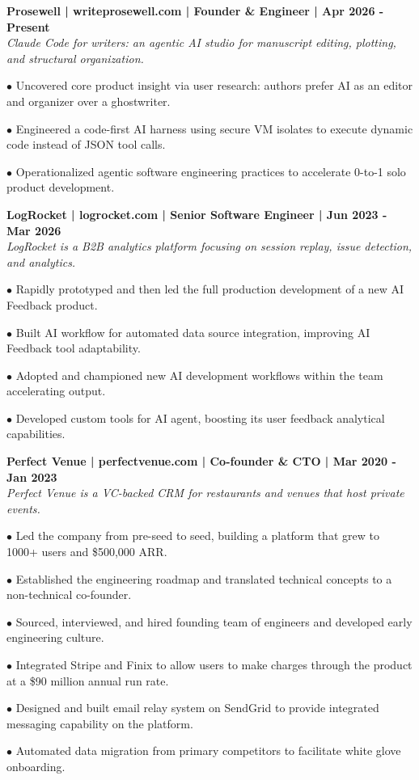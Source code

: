 \documentclass{article}
\begin{document}
	\begin{description}
	\setlength{\itemsep}{0pt}

	 \item \textbf{Prosewell | writeprosewell.com | Founder \& Engineer | Apr 2026 - Present} \\
	 \textit{Claude Code for writers: an agentic AI studio for manuscript editing, plotting, and structural organization.}

	 \item$\bullet$ Uncovered core product insight via user research: authors prefer AI as an editor and organizer over a ghostwriter.
	 \item$\bullet$ Engineered a code-first AI harness using secure VM isolates to execute dynamic code instead of JSON tool calls.
	 \item$\bullet$ Operationalized agentic software engineering practices to accelerate 0-to-1 solo product development.

	 \item \textbf{LogRocket | logrocket.com | Senior Software Engineer | Jun 2023 - Mar 2026} \\
	 \textit{LogRocket is a B2B analytics platform focusing on session replay, issue detection, and analytics.}

	 \item$\bullet$ Rapidly prototyped and then led the full production development of a new AI Feedback product.
	 \item$\bullet$ Built AI workflow for automated data source integration, improving AI Feedback tool adaptability.
	 \item$\bullet$ Adopted and championed new AI development workflows within the team accelerating output.
	 \item$\bullet$ Developed custom tools for AI agent, boosting its user feedback analytical capabilities.
	
	 \item \textbf{Perfect Venue | perfectvenue.com | Co-founder \& CTO | Mar 2020 - Jan 2023} \\
	 \textit{Perfect Venue is a VC-backed CRM for restaurants and venues that host private events.}
	 \item$\bullet$ Led the company from pre-seed to seed, building a platform that grew to 1000+ users and \$500,000 ARR.
	 \item$\bullet$ Established the engineering roadmap and translated technical concepts to a non-technical co-founder.
	 \item$\bullet$ Sourced, interviewed, and hired founding team of engineers and developed early engineering culture.
	 \item$\bullet$ Integrated Stripe and Finix to allow users to make charges through the product at a \$90 million annual run rate.
	 \item$\bullet$ Designed and built email relay system on SendGrid to provide integrated messaging capability on the platform.
	 \item$\bullet$ Automated data migration from primary competitors to facilitate white glove onboarding.
	

\end{description}
\end{document}
